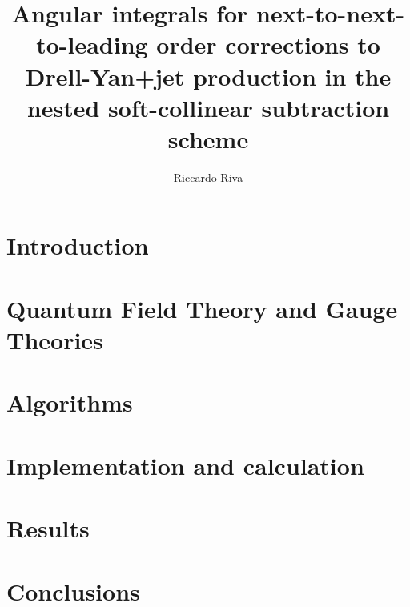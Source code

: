 \documentclass[12pt]{report}
\title{Angular integrals for next-to-next-to-leading order corrections to Drell-Yan+jet production in the nested soft-collinear subtraction scheme}
\author{Riccardo Riva}
\begin{document}
%

%

\dominitoc%
\tableofcontents

\chapter*{Introduction}
 
\adjustmtc %
\label{chapter:intro}


\chapter{Quantum Field Theory and Gauge Theories}
\minitoc
\label{chapter:qft}



\chapter{Algorithms}
\minitoc
\label{chapter:algorithms}



\chapter{Implementation and calculation}
\minitoc
\label{chapter:implementation}

    

\chapter{Results}
\minitoc
\label{chapter:results}



\chapter*{Conclusions}
 
\adjustmtc %
\label{chapter:conclusions}

\end{document}

